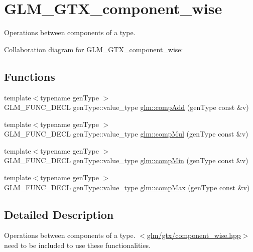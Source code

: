 \hypertarget{group__gtx__component__wise}{\section{G\-L\-M\-\_\-\-G\-T\-X\-\_\-component\-\_\-wise}
\label{group__gtx__component__wise}
}


Operations between components of a type.  


Collaboration diagram for G\-L\-M\-\_\-\-G\-T\-X\-\_\-component\-\_\-wise\-:
\subsection*{Functions}
\begin{DoxyCompactItemize}
\item 
{\footnotesize template$<$typename gen\-Type $>$ }\\G\-L\-M\-\_\-\-F\-U\-N\-C\-\_\-\-D\-E\-C\-L gen\-Type\-::value\-\_\-type \hyperlink{group__gtx__component__wise_gaf71833350e15e74d31cbf8a3e7f27051}{glm\-::comp\-Add} (gen\-Type const \&v)
\item 
{\footnotesize template$<$typename gen\-Type $>$ }\\G\-L\-M\-\_\-\-F\-U\-N\-C\-\_\-\-D\-E\-C\-L gen\-Type\-::value\-\_\-type \hyperlink{group__gtx__component__wise_gae8ab88024197202c9479d33bdc5a8a5d}{glm\-::comp\-Mul} (gen\-Type const \&v)
\item 
{\footnotesize template$<$typename gen\-Type $>$ }\\G\-L\-M\-\_\-\-F\-U\-N\-C\-\_\-\-D\-E\-C\-L gen\-Type\-::value\-\_\-type \hyperlink{group__gtx__component__wise_gab5d0832b5c7bb01b8d7395973bfb1425}{glm\-::comp\-Min} (gen\-Type const \&v)
\item 
{\footnotesize template$<$typename gen\-Type $>$ }\\G\-L\-M\-\_\-\-F\-U\-N\-C\-\_\-\-D\-E\-C\-L gen\-Type\-::value\-\_\-type \hyperlink{group__gtx__component__wise_gabfa4bb19298c8c73d4217ba759c496b6}{glm\-::comp\-Max} (gen\-Type const \&v)
\end{DoxyCompactItemize}


\subsection{Detailed Description}
Operations between components of a type. $<$\hyperlink{component__wise_8hpp}{glm/gtx/component\-\_\-wise.\-hpp}$>$ need to be included to use these functionalities. 

